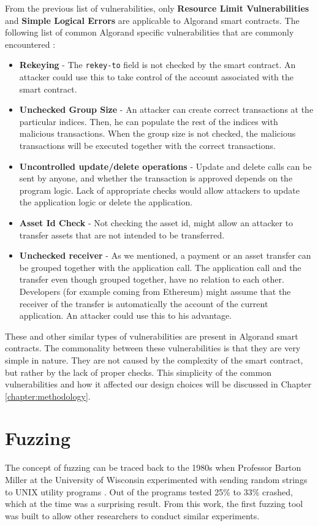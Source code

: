 From the previous list of vulnerabilities, only \textbf{Resource Limit Vulnerabilities} and \textbf{Simple Logical Errors} are applicable to Algorand smart contracts. The following list of common Algorand specific vulnerabilities that are commonly encountered \cite{crytic_building-secure-contractsnot-so-smart-contractsalgorand_nodate,sun_panda_2023}:
\begin{itemize}
    \item \textbf{Rekeying} - The \texttt{rekey-to} field is not checked by the smart contract. An attacker could use this to take control of the account associated with the smart contract.
    \item \textbf{Unchecked Group Size} - An attacker can create correct transactions at the particular indices. Then, he can populate the rest of the indices with malicious transactions. When the group size is not checked, the malicious transactions will be executed together with the correct transactions.
    \item \textbf{Uncontrolled update/delete operations} - Update and delete calls can be sent by anyone, and whether the transaction is approved depends on the program logic. Lack of appropriate checks would allow attackers to update the application logic or delete the application.
    \item \textbf{Asset Id Check} - Not checking the asset id, might allow an attacker to transfer assets that are not intended to be transferred.
    \item \textbf{Unchecked receiver} - As we mentioned, a payment or an asset transfer can be grouped together with the application call. The application call and the transfer even though grouped together, have no relation to each other. Developers (for example coming from Ethereum) might assume that the receiver of the transfer is automatically the account of the current application. An attacker could use this to his advantage.
\end{itemize}

These and other similar types of vulnerabilities are present in Algorand smart contracts.
The commonality between these vulnerabilities is that they are very simple in nature.
They are not caused by the complexity of the smart contract, but rather by the lack of proper checks.
This simplicity of the common vulnerabilities and how it affected our design choices will be discussed in Chapter \ref{chapter:methodology}.

\section{Fuzzing} \label{section:fuzzing}
The concept of fuzzing can be traced back to the 1980s when Professor Barton Miller at the University of Wisconsin experimented with sending random strings to UNIX utility programs \cite{miller_empirical_1990}.
Out of the programs tested 25\% to 33\% crashed, which at the time was a surprising result.
From this work, the first fuzzing tool was built to allow other researchers to conduct similar experiments.


